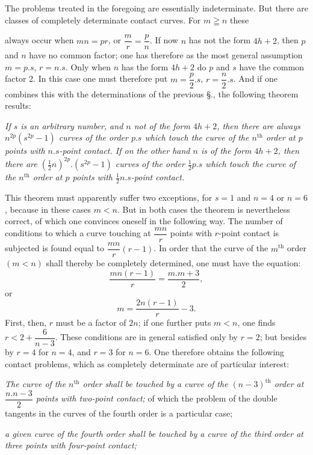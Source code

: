 \documentclass{article}
\begin{document}
The problems treated in the foregoing are essentially indeterminate. But there are classes of completely determinate contact curves. For $m \geqq n$ these

always occur when $mn = pr$, or $\dfrac{m}{r} = \dfrac{p}{n}$. If now $n$ has not the form $4h+2$, then $p$ and $n$ have no common factor; one has therefore as the most general assumption $m = p.s$, $r = n.s$. Only when $n$ has the form $4h+2$ do $p$ and $s$ have the common factor 2. In this case one must therefore put $m = \dfrac{p}{2}.s$, $r = \dfrac{n}{2}.s$. And if one combines this with the determinations of the previous §., the following theorem results:

\emph{If $s$ is an arbitrary number, and $n$ not of the form $4h+2$, then there are always $n^{2p}(s^{2p}-1)$ curves of the order $p.s$ which touch the curve of the $n^{\text{th}}$ order at $p$ points with $n.s$-point contact. If on the other hand $n$ is of the form $4h+2$, then there are $(\tfrac{1}{2}n)^{2p}.(s^{2p}-1)$ curves of the order $\tfrac{1}{2}p.s$ which touch the curve of the $n^{\text{th}}$ order at $p$ points with $\tfrac{1}{2}n.s$-point contact.}

This theorem must apparently suffer two exceptions, for $s = 1$ and $n = 4$ or $n = 6$, because in these cases $m < n$. But in both cases the theorem is nevertheless correct, of which one convinces oneself in the following way. The number of conditions to which a curve touching at $\dfrac{mn}{r}$ points with $r$-point contact is subjected is found equal to $\dfrac{mn}{r}(r-1)$. In order that the curve of the $m^{\text{th}}$ order $(m < n)$ shall thereby be completely determined, one must have the equation:
\[ \frac{mn(r-1)}{r} = \frac{m.m+3}{2}, \]
or
\[ m = \frac{2n(r-1)}{r} - 3. \]
First, then, $r$ must be a factor of $2n$; if one further puts $m < n$, one finds $r < 2 + \dfrac{6}{n-3}$. These conditions are in general satisfied only by $r = 2$; but besides by $r = 4$ for $n = 4$, and $r = 3$ for $n = 6$. One therefore obtains the following contact problems, which as completely determinate are of particular interest:

\emph{The curve of the $n^{\text{th}}$ order shall be touched by a curve of the $(n-3)^{\text{th}}$ order at $\dfrac{n.n-3}{2}$ points with two-point contact;}
of which the problem of the double tangents in the curves of the fourth order is a particular case;

\emph{a given curve of the fourth order shall be touched by a curve of the third order at three points with four-point contact;}
\end{document}
